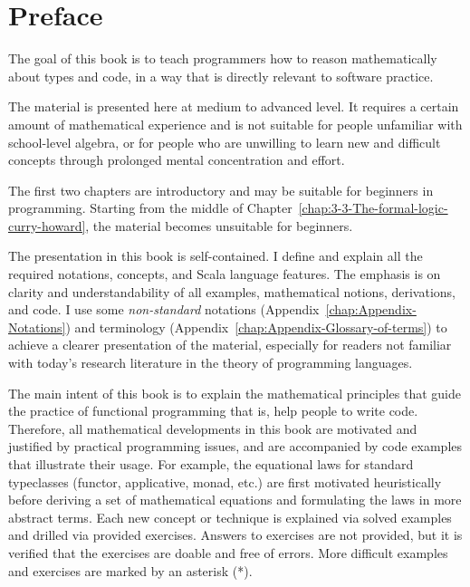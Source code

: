 
\chapter*{Preface}


The goal of this book is to teach programmers how to reason mathematically
about types and code, in a way that is directly relevant to software
practice.

The material is presented here at medium to advanced level. It requires
a certain amount of mathematical experience and is not suitable for
people unfamiliar with school-level algebra, or for people who are
unwilling to learn new and difficult concepts through prolonged mental
concentration and effort.

The first two chapters are introductory and may be suitable for beginners
in programming. Starting from the middle of Chapter~\ref{chap:3-3-The-formal-logic-curry-howard},
the material becomes unsuitable for beginners. 

The presentation in this book is self-contained. I define and explain
all the required notations, concepts, and Scala language features.
The emphasis is on clarity and understandability of all examples,
mathematical notions, derivations, and code. I use some \emph{non-standard}
notations (Appendix~\ref{chap:Appendix-Notations}) and terminology
(Appendix~\ref{chap:Appendix-Glossary-of-terms}) to achieve a clearer
presentation of the material, especially for readers not familiar
with today's research literature in the theory of programming languages.

The main intent of this book is to explain the mathematical principles
that guide the practice of functional programming \textendash{} that
is, help people to write code. Therefore, all mathematical developments
in this book are motivated and justified by practical programming
issues, and are accompanied by code examples that illustrate their
usage. For example, the equational laws for standard typeclasses (functor,
applicative, monad, etc.) are first motivated heuristically before
deriving a set of mathematical equations and formulating the laws
in more abstract terms. Each new concept or technique is explained
via solved examples and drilled via provided exercises. Answers to
exercises are not provided, but it is verified that the exercises
are doable and free of errors. More difficult examples and exercises
are marked by an asterisk ({*}).

